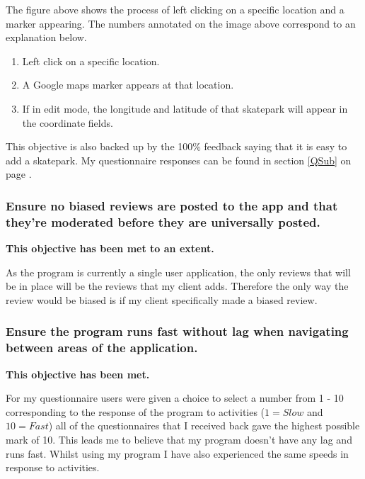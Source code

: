 The figure above shows the process of left clicking on a specific location and a marker appearing. The numbers annotated on the image above correspond to an explanation below.

\begin{enumerate}
\item Left click on a specific location.
\item A Google maps marker appears at that location.
\item If in edit mode, the longitude and latitude of that skatepark will appear in the coordinate fields.
\end{enumerate}

This objective is also backed up by the 100\% feedback saying that it is easy to add a skatepark. My questionnaire responses can be found in section \ref{QSub} on page \pageref{QSub}.




\subsubsection {Ensure no biased reviews are posted to the app and that they're moderated before they are universally posted.}

\textbf{This objective has been met to an extent.}

As the program is currently a single user application, the only reviews that will be in place will be the reviews that my client adds. Therefore the only way the review would be biased is if my client specifically made a biased review. 



\subsubsection {Ensure the program runs fast without lag when navigating between areas of the application.}  %

\textbf{This objective has been met.}

For my questionnaire users were given a choice to select a number from 1 - 10 corresponding to the response of the program to activities ($1 = Slow$ and $10 = Fast$) all of the questionnaires that I received back gave the highest possible mark of 10. This leads me to believe that my program doesn't have any lag and runs fast. Whilst using my program I have also experienced the same speeds in response to activities.








